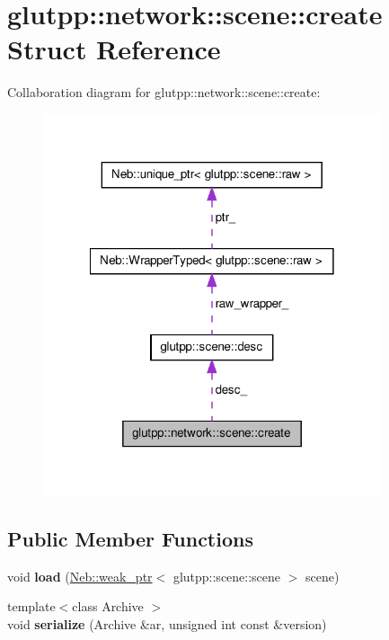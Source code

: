 \hypertarget{structglutpp_1_1network_1_1scene_1_1create}{\section{glutpp\-:\-:network\-:\-:scene\-:\-:create \-Struct \-Reference}
\label{structglutpp_1_1network_1_1scene_1_1create}
}


\-Collaboration diagram for glutpp\-:\-:network\-:\-:scene\-:\-:create\-:\nopagebreak
\begin{figure}[H]
\begin{center}
\leavevmode
\includegraphics[width=282pt]{structglutpp_1_1network_1_1scene_1_1create__coll__graph}
\end{center}
\end{figure}
\subsection*{\-Public \-Member \-Functions}
\begin{DoxyCompactItemize}
\item 
\hypertarget{structglutpp_1_1network_1_1scene_1_1create_ab8c8e0a44dbfb5682375a1f587120275}{void {\bfseries load} (\hyperlink{classNeb_1_1weak__ptr}{\-Neb\-::weak\-\_\-ptr}$<$ glutpp\-::scene\-::scene $>$ scene)}\label{structglutpp_1_1network_1_1scene_1_1create_ab8c8e0a44dbfb5682375a1f587120275}

\item 
\hypertarget{structglutpp_1_1network_1_1scene_1_1create_a17f38bf631168fcfdd88f301917339c8}{{\footnotesize template$<$class Archive $>$ }\\void {\bfseries serialize} (\-Archive \&ar, unsigned int const \&version)}\label{structglutpp_1_1network_1_1scene_1_1create_a17f38bf631168fcfdd88f301917339c8}

\end{DoxyCompactItemize}
